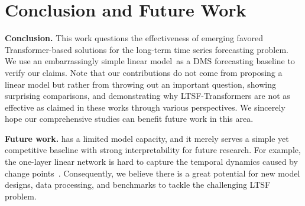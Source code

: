 \vspace{-0.4cm}
\section{Conclusion and Future Work}
\label{sec:conclusion}
\textbf{Conclusion.}
This work questions the effectiveness of emerging favored Transformer-based solutions for the long-term time series forecasting problem. We use an embarrassingly simple linear model~\modelname as a DMS forecasting baseline to verify our claims. Note that our contributions do not come from proposing a linear model but rather from throwing out an important question, showing surprising comparisons, and demonstrating why LTSF-Transformers are not as effective as claimed in these works through various perspectives.
We sincerely hope our comprehensive studies can benefit future work in this area.

\textbf{Future work.} \modelname has a limited model capacity, and it merely serves a simple yet competitive baseline with strong interpretability for future research. For example, the one-layer linear network is hard to capture the temporal dynamics caused by change points~\cite{van2020evaluation}. Consequently, we believe there is a great potential for new model designs, data processing, and benchmarks to tackle the challenging LTSF problem. 
